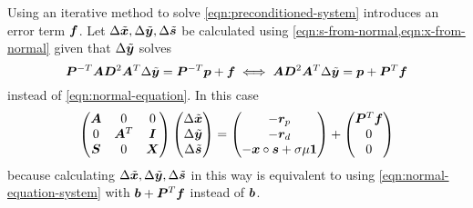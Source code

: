 Using an iterative method to solve \cref{eqn:preconditioned-system} introduces an error term \(\bm{f}\). Let \(\Delta\tilde{\bm{x}}, \Delta\tilde{\bm{y}}, \Delta\tilde{\bm{s}}\) be calculated using \cref{eqn:s-from-normal,eqn:x-from-normal} given that \(\Delta\tilde{\bm{y}}\) solves
\begin{equation}
 \bm{P}^{-T} \bm{A} \bm{D}^2 \bm{A}^T \Delta\tilde{\bm{y}} = \bm{P}^{-T} \bm{p} + \bm{f} \iff \bm{A} \bm{D}^2 \bm{A}^T \Delta\tilde{\bm{y}} = \bm{p} + \bm{P}^{T} \bm{f}
\end{equation}
instead of \cref{eqn:normal-equation}. In this case
\begin{equation}
  \begin{pmatrix}
    \bm{A} & 0         & 0       \\
    0       & \bm{A}^T & \bm{I} \\
    \bm{S} & 0         & \bm{X} \\
  \end{pmatrix}
  \begin{pmatrix} \Delta\tilde{\bm{x}} \\ \Delta\tilde{\bm{y}} \\ \Delta\tilde{\bm{s}} \end{pmatrix}
  =
  \begin{pmatrix} -\bm{r}_p \\ -\bm{r}_d \\ -\bm{x} \circ \bm{s} + \sigma \mu \bm{1} \end{pmatrix}
  +
  \begin{pmatrix} \bm{P}^T \bm{f} \\ 0 \\ 0 \end{pmatrix}
\end{equation}
because calculating \(\Delta\tilde{\bm{x}}, \Delta\tilde{\bm{y}}, \Delta\tilde{\bm{s}}\) in this way is equivalent to using \cref{eqn:normal-equation-system} with \(\bm{b} + \bm{P}^T \bm{f}\) instead of \(\bm{b}\).

